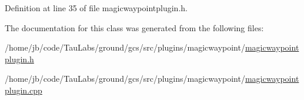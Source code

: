\-Definition at line 35 of file magicwaypointplugin.\-h.



\-The documentation for this class was generated from the following files\-:\begin{DoxyCompactItemize}
\item 
/home/jb/code/\-Tau\-Labs/ground/gcs/src/plugins/magicwaypoint/\hyperlink{magicwaypointplugin_8h}{magicwaypointplugin.\-h}\item 
/home/jb/code/\-Tau\-Labs/ground/gcs/src/plugins/magicwaypoint/\hyperlink{magicwaypointplugin_8cpp}{magicwaypointplugin.\-cpp}\end{DoxyCompactItemize}
